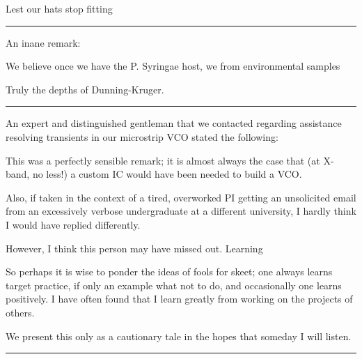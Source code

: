 \documentclass[paper.tex]{subfiles}
\begin{document}
Lest our hats stop fitting

\rule{\linewidth}{0.2pt}

An inane remark:

\begin{displayquote}
We believe once we have the P. Syringae host, we from environmental samples
\end{displayquote}

Truly the depths of Dunning-Kruger.

\rule{\linewidth}{0.2pt}

An expert and distinguished gentleman that we contacted regarding assistance resolving transients in our microstrip VCO stated the following:



This was a perfectly sensible remark; it is almost always the case that (at X-band, no less!) a custom IC would have been needed to build a VCO.

Also, if taken in the context of a tired, overworked PI getting an unsolicited email from an excessively verbose undergraduate at a different university, I hardly think I would have replied differently.

However, I think this person may have missed out. Learning 

So perhaps it is wise to ponder the ideas of fools for skeet; one always learns target practice, if only an example what not to do, and occasionally one learns positively. I have often found that I learn greatly from working on the projects of others.

We present this only as a cautionary tale in the hopes that someday I will listen.

\rule{\linewidth}{0.2pt}


\end{document}

